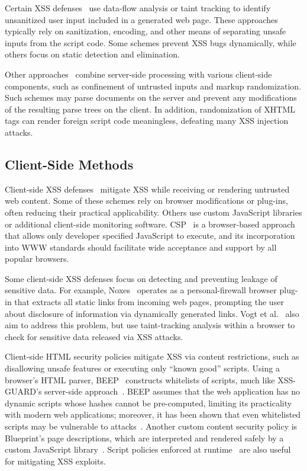Certain XSS
defenses~\cite{nguyen05:hardening,pietraszek05,xie06:static,jovanovic06:pixy-improved,martin08:autoxss,tripp09:taj,livshits05:java-static,johns07:smask,saxena10:kudzu}
use data-flow analysis or taint tracking to identify unsanitized user
input included in a generated web page. These approaches typically
rely on sanitization, encoding, and other means of separating unsafe
inputs from the script code. Some schemes prevent XSS bugs
dynamically, while others focus on static detection and elimination.

Other
approaches~\cite{nadji08:structure-integrity,vangundy09:noncespaces,louw09:blueprint}
combine server-side processing with various client-side components,
such as confinement of untrusted inputs and markup randomization. Such
schemes may parse documents on the server and prevent any
modifications of the resulting parse trees on the client. In addition,
randomization of XHTML tags can render foreign script code
meaningless, defeating many XSS injection attacks.

\subsection{Client-Side Methods}

Client-side XSS
defenses~\cite{kirda06:noxes,vogt07,jim07:beep,meyerovich10:conscript,stamm10:csp,weinberger11:client}
mitigate XSS while receiving or rendering untrusted web content. Some
of these schemes rely on browser modifications or plug-ins, often
reducing their practical applicability. Others use custom JavaScript
libraries or additional client-side monitoring software.
CSP~\cite{stamm10:csp} is a browser-based approach that allows only
developer specified JavaScript to execute, and its incorporation into
WWW standards should facilitate wide acceptance and support by all
popular browsers.

Some client-side XSS defenses focus on detecting and preventing
leakage of sensitive data. For example, Noxes~\cite{kirda06:noxes}
operates as a personal-firewall browser plug-in that extracts all
static links from incoming web pages, prompting the user about
disclosure of information via dynamically generated links. Vogt et
al.~\cite{vogt07} also aim to address this problem, but use
taint-tracking analysis within a browser to check for sensitive data
released via XSS attacks.

Client-side HTML security policies mitigate XSS via content
restrictions, such as disallowing unsafe features or executing only
``known good'' scripts. Using a browser's HTML parser,
BEEP~\cite{jim07:beep} constructs whitelists of scripts, much like
XSS-GUARD's server-side approach~\cite{bisht08:xssguard}. BEEP assumes
that the web application has no dynamic scripts whose hashes cannot be
pre-computed, limiting its practicality with modern web applications;
moreover, it has been shown that even whitelisted scripts may be
vulnerable to attacks~\cite{athanasopoulos09}. Another custom content
security policy is {\sc Blueprint}'s page descriptions, which are
interpreted and rendered safely by a custom JavaScript
library~\cite{louw09:blueprint}. Script policies enforced at
runtime~\cite{hallaraker05,meyerovich10:conscript} are also useful for
mitigating XSS exploits.

